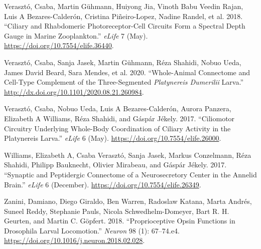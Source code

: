 \documentclass[
]{article}
\newlength{\cslhangindent}
\newlength{\cslentryspacingunit} %
\newenvironment{CSLReferences}[2] %
 {%
  \setlength{\parindent}{0pt}
  \ifodd #1
  \let\oldpar\par
  \def\par{\hangindent=\cslhangindent\oldpar}
  \fi
  \setlength{\parskip}{#2\cslentryspacingunit}
 }%
 {}
\begin{document}
\begin{CSLReferences}{1}{0}
\leavevmode{}%
Verasztó, Csaba, Martin Gühmann, Huiyong Jia, Vinoth Babu Veedin Rajan,
Luis A Bezares-Calderón, Cristina Piñeiro-Lopez, Nadine Randel, et al.
2018. {``Ciliary and Rhabdomeric Photoreceptor-Cell Circuits Form a
Spectral Depth Gauge in Marine Zooplankton.''} \emph{eLife} 7 (May).
\url{https://doi.org/10.7554/elife.36440}.

\leavevmode{}%
Verasztó, Csaba, Sanja Jasek, Martin Gühmann, Réza Shahidi, Nobuo Ueda,
James David Beard, Sara Mendes, et al. 2020. {``Whole-Animal Connectome
and Cell-Type Complement of the Three-Segmented {\emph{Platynereis
Dumerilii}} Larva.''} \url{http://dx.doi.org/10.1101/2020.08.21.260984}.

\leavevmode{}%
Verasztó, Csaba, Nobuo Ueda, Luis A Bezares-Calderón, Aurora Panzera,
Elizabeth A Williams, Réza Shahidi, and Gáspár Jékely. 2017.
{``Ciliomotor Circuitry Underlying Whole-Body Coordination of Ciliary
Activity in the Platynereis Larva.''} \emph{eLife} 6 (May).
\url{https://doi.org/10.7554/elife.26000}.

\leavevmode{}%
Williams, Elizabeth A, Csaba Verasztó, Sanja Jasek, Markus Conzelmann,
Réza Shahidi, Philipp Bauknecht, Olivier Mirabeau, and Gáspár Jékely.
2017. {``Synaptic and Peptidergic Connectome of a Neurosecretory Center
in the Annelid Brain.''} \emph{eLife} 6 (December).
\url{https://doi.org/10.7554/elife.26349}.

\leavevmode{}%
Zanini, Damiano, Diego Giraldo, Ben Warren, Radoslaw Katana, Marta
Andrés, Suneel Reddy, Stephanie Pauls, Nicola Schwedhelm-Domeyer, Bart
R. H. Geurten, and Martin C. Göpfert. 2018. {``Proprioceptive Opsin
Functions in Drosophila Larval Locomotion.''} \emph{Neuron} 98 (1):
67--74.e4. \url{https://doi.org/10.1016/j.neuron.2018.02.028}.

\end{CSLReferences}
\end{document}
